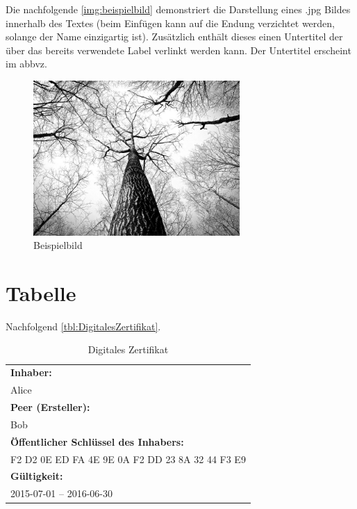 Die nachfolgende \autoref{img:beispielbild} demonstriert die Darstellung eines \glqq *.jpg\grqq{} Bildes innerhalb des Textes (beim Einfügen kann auf die Endung verzichtet werden, solange der Name einzigartig ist). Zusätzlich enthält dieses einen Untertitel der über das bereits verwendete Label verlinkt werden kann. Der Untertitel erscheint im \gls{abbvz}.
\\
\begin{figure}[H]
	\centering
	\includegraphics[width=0.7\textwidth]{resources/example}
	\caption{Beispielbild {\cite{PEXELS2015}}}
	\label{img:beispielbild}
\end{figure}

\section{Tabelle}

Nachfolgend \autoref{tbl:DigitalesZertifikat}.

\begin{table}[H]
	\begin{center}
		\renewcommand{\arraystretch}{1.3}
		\begin{tabular}{|l|}
			\hline
			\textbf{Inhaber:}\\
			Alice \\ \hline
			\textbf{Peer (Ersteller):}\\
			Bob \\ \hline
			\textbf{Öffentlicher Schlüssel des Inhabers:}\\
			F2 D2 0E ED FA 4E 9E 0A F2 DD 23 8A 32 44 F3 E9 \\ \hline
			\textbf{Gültigkeit:}\\
			2015-07-01 – 2016-06-30 \\ \hline
		\end{tabular}
	\end{center}
	\caption{Digitales Zertifikat}
	\label{tbl:DigitalesZertifikat}
\end{table}

